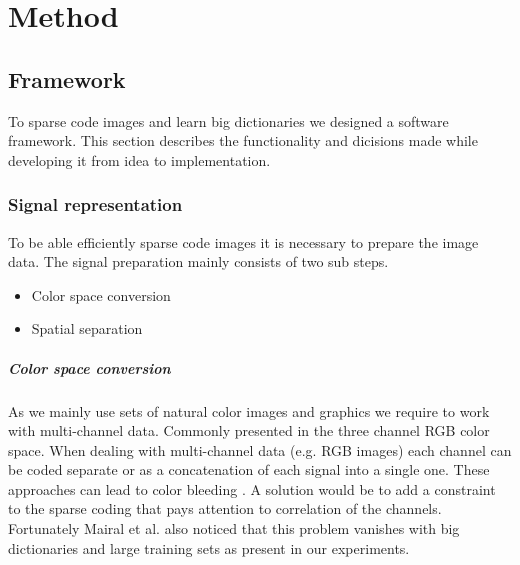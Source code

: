 \chapter{Method}

\section{Framework}
To sparse code images and learn big dictionaries we designed a software
framework. This section describes the functionality and dicisions made while
developing it from idea to implementation.

\subsection{Signal representation}
\label{sec:signal_representation}
To be able efficiently sparse code images it is necessary to prepare the
image data. The signal preparation mainly consists of two sub steps.
\begin{itemize}
 \item Color space conversion
 \item Spatial separation
\end{itemize}

\paragraph{Color space conversion} As we mainly use sets of natural color images
and graphics we require to work with multi-channel data. Commonly presented in
the three channel RGB color space.
When dealing with multi-channel data (e.g. RGB images) each channel can be coded
separate or as a concatenation of each signal into a single one. These
approaches can lead to color bleeding \cite{mairal08sparse}. 
A solution would be to add a constraint to the sparse coding that pays
attention to correlation of the channels.  
Fortunately Mairal et al. also noticed that this problem vanishes with big
dictionaries and large training sets as present in our experiments.
\cite{mairal08sparse}


